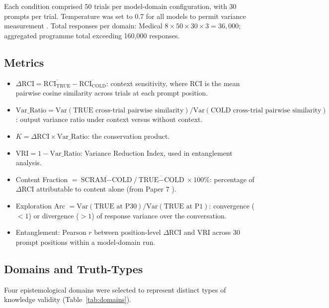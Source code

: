\documentclass[11pt,a4paper]{article}
\begin{document}
Each condition comprised 50 trials per model-domain configuration, with 30 prompts per
trial. Temperature was set to 0.7 for all models to permit variance measurement
\citep{renze2024,shi2024decoding,atil2024,dietrich2025reproducibility}. Total responses per domain: Medical
$8 \times 50 \times 30 \times 3 = 36{,}000$; aggregated programme total exceeding
160,000 responses.

\subsection{Metrics}

\begin{itemize}
    \item $\Delta\text{RCI} = \overline{\text{RCI}_\text{TRUE}} -
    \overline{\text{RCI}_\text{COLD}}$: context sensitivity, where RCI is the
    mean pairwise cosine similarity across trials at each prompt position.
    \item $\text{Var\_Ratio} = \text{Var}(\text{TRUE cross-trial pairwise similarity})
    / \text{Var}(\text{COLD cross-trial pairwise similarity})$: output variance ratio
    under context versus without context.
    \item $K = \Delta\text{RCI} \times \text{Var\_Ratio}$: the conservation product.
    \item $\text{VRI} = 1 - \text{Var\_Ratio}$: Variance Reduction Index, used in
    entanglement analysis.
    \item Content Fraction $= \overline{\text{SCRAM}-\text{COLD}} /
    \overline{\text{TRUE}-\text{COLD}} \times 100\%$: percentage of $\Delta$RCI
    attributable to content alone (from Paper 7 \citep{laxman2026g}).
    \item Exploration Arc $= \text{Var}(\text{TRUE at P30}) /
    \text{Var}(\text{TRUE at P1})$: convergence ($<1$) or divergence ($>1$) of
    response variance over the conversation.
    \item Entanglement: Pearson $r$ between position-level $\Delta$RCI and VRI
    across 30 prompt positions within a model-domain run.
\end{itemize}

\subsection{Domains and Truth-Types}

Four epistemological domains were selected to represent distinct types of knowledge
validity (Table~\ref{tab:domains}).
\end{document}
